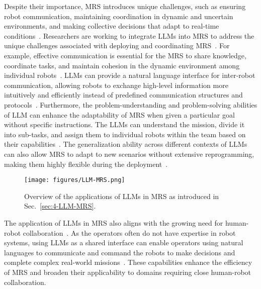 Despite their importance, MRS introduces unique challenges, such as ensuring robot communication, maintaining coordination in dynamic and uncertain environments, and making collective decisions that adapt to real-time conditions~\cite{gielis2022critical, an2023multi}. Researchers are working to integrate LLMs into MRS to address the unique challenges associated with deploying and coordinating MRS~\cite{chen_scalable_2024, mandi_roco_2024}. For example, effective communication is essential for the MRS to share knowledge, coordinate tasks, and maintain cohesion in the dynamic environment among individual robots~\cite{gielis2022critical}. LLMs can provide a natural language interface for inter-robot communication, allowing robots to exchange high-level information more intuitively and efficiently instead of predefined communication structures and protocols~\cite{mandi_roco_2024}. Furthermore, the problem-understanding and problem-solving abilities of LLM can enhance the adaptability of MRS when given a particular goal without specific instructions. The LLMs can understand the mission, divide it into sub-tasks, and assign them to individual robots within the team based on their capabilities~\cite{liu_coherent_2024, chen_emos_2024}. The generalization ability across different contexts of LLMs can also allow MRS to adapt to new scenarios without extensive reprogramming, making them highly flexible during the deployment~\cite{wang_dart-llm_2024, yu_co-navgpt_2023}.

\begin{figure} \label{fig:sec-1-llm-mrs}
    \centering
    \texttt{[image: figures/LLM-MRS.png]}
    \caption{Overview of the applications of LLMs in MRS as introduced in Sec.~\ref{sec:4-LLM-MRS}.}
\end{figure}

The application of LLMs in MRS also aligns with the growing need for human-robot collaboration~\cite{hunt_survey_2024}. As the operators often do not have expertise in robot systems, using LLMs as a shared interface can enable operators using natural languages to communicate and command the robots to make decisions and complete complex real-world missions~\cite{ahn_vader_2024}. These capabilities enhance the efficiency of MRS and broaden their applicability to domains requiring close human-robot collaboration.


